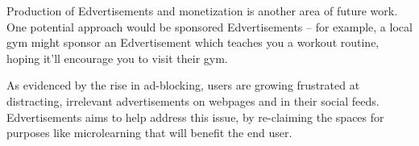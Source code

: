 \documentclass{sigchi}
\begin{document}
Production of Edvertisements and monetization is another area of future work. One potential approach would be sponsored Edvertisements -- for example, a local gym might sponsor an Edvertisement which teaches you a workout routine, hoping it'll encourage you to visit their gym.

As evidenced by the rise in ad-blocking, users are growing frustrated at distracting, irrelevant advertisements on webpages and in their social feeds. Edvertisements aims to help address this issue, by re-claiming the spaces for purposes like microlearning that will benefit the end user.







\end{document}
